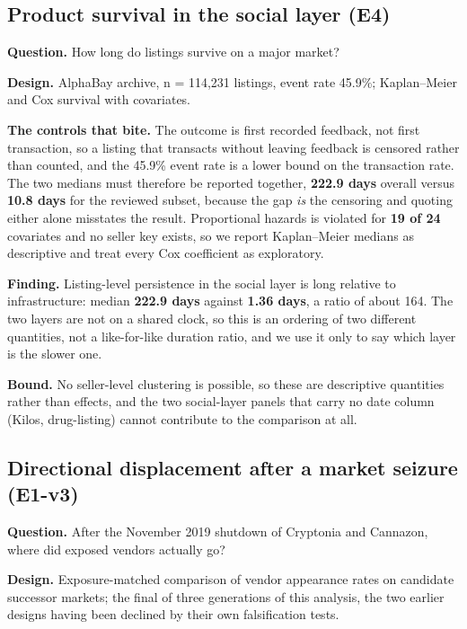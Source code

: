 \subsection{Product survival in the social layer (E4)}\label{sec:e4}

\textbf{Question.} How long do listings survive on a major market?

\textbf{Design.} AlphaBay archive, n = 114,231 listings, event rate 45.9\%;
Kaplan--Meier and Cox survival with covariates.

\textbf{The controls that bite.} The outcome is first recorded feedback, not
first transaction, so a listing that transacts without leaving feedback is
censored rather than counted, and the 45.9\% event rate is a lower bound on the
transaction rate. The two medians must therefore be reported together,
\textbf{222.9 days} overall versus \textbf{10.8 days} for the reviewed subset,
because the gap \emph{is} the censoring and quoting either alone misstates the
result. Proportional hazards is violated for \textbf{19 of 24} covariates and no
seller key exists, so we report Kaplan--Meier medians as descriptive and treat
every Cox coefficient as exploratory.

\textbf{Finding.} Listing-level persistence in the social layer is long relative
to infrastructure: median \textbf{222.9 days} against \textbf{1.36 days}, a
ratio of about 164. The two layers are not on a shared clock, so this is an
ordering of two different quantities, not a like-for-like duration ratio, and we
use it only to say which layer is the slower one.

\textbf{Bound.} No seller-level clustering is possible, so these are descriptive
quantities rather than effects, and the two social-layer panels that carry no
date column (Kilos, drug-listing) cannot contribute to the comparison at all.

\subsection{Directional displacement after a market seizure (E1-v3)}\label{sec:e1v3}

\textbf{Question.} After the November 2019 shutdown of Cryptonia and Cannazon,
where did exposed vendors actually go?

\textbf{Design.} Exposure-matched comparison of vendor appearance rates on
candidate successor markets; the final of three generations of this analysis,
the two earlier designs having been declined by their own falsification tests.

